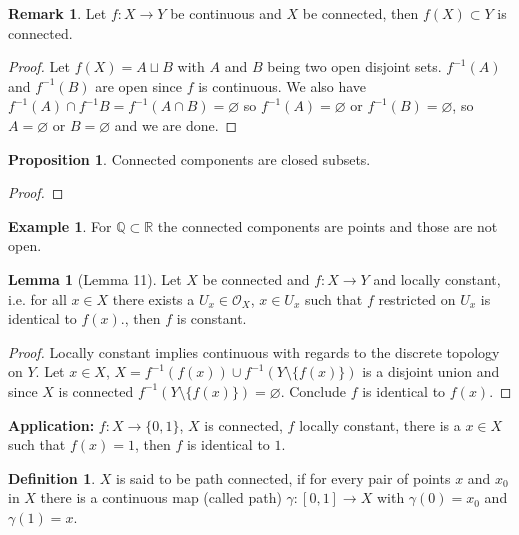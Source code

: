 \documentclass[a4paper]{book}
\theoremstyle{definition}
\newtheorem{definition}{Definition}[chapter]
\newtheorem{example}{Example}[definition]
\newtheorem{lemma}{Lemma}[definition]
\newtheorem{proposition}{Proposition}[definition]
\newtheorem*{remark}{Remark}
\begin{document}
    \begin{remark}
        Let \(f: X \longrightarrow Y\) be continuous and \(X\) be connected, then \(f(X) \subset Y\) is connected.
    \end{remark}
    \begin{proof}
        Let \(f(X) = A \sqcup B\) with \(A\) and \(B\) being two open disjoint sets. \(f^{-1}(A)\) and \(f^{-1}(B)\) are open since \(f\) is continuous. We also have \(f^{-1}(A) \cap f^{-1}B = f^{-1}(A \cap B) = \varnothing\) so \(f^{-1}(A) = \varnothing\) or \(f^{-1}(B) = \varnothing\), so \(A = \varnothing\) or \(B = \varnothing\) and we are done.
    \end{proof}
    \begin{proposition}
        Connected components are closed subsets.
    \end{proposition}
    \begin{proof}
    \end{proof}
    \begin{example}
        For \(\mathbb{Q} \subset \mathbb{R}\) the connected components are points and those are not open.
    \end{example}
    \begin{lemma}[Lemma 11]
        Let \(X\) be connected and \(f: X \longrightarrow Y\) and locally constant, i.e. for all \(x \in X\) there exists a \(U_x \in \mathcal{O}_X\), \(x \in U_x\) such that \(f\) restricted on \(U_x\) is identical to \(f(x)\)., then \(f\) is constant.
    \end{lemma}
    \begin{proof}
        Locally constant implies continuous with regards to the discrete topology on \(Y\). Let \(x \in X\), \(X = f^{-1}(f(x)) \cup f^{-1}(Y \setminus \{f(x)\})\) is a disjoint union and since \(X\) is connected \(f^{-1}(Y \setminus \{f(x)\}) = \varnothing\). Conclude \(f\) is identical to \(f(x)\).
    \end{proof}

    \textbf{Application:} \(f: X \longrightarrow \{0, 1\}\), \(X\) is connected, \(f\) locally constant, there is a \(x \in X\) such that \(f(x) = 1\), then \(f\) is identical to \(1\).

    \begin{defbox}
        \begin{definition}
            \(X\) is said to be {\color{maththen}path connected}, if for every pair of points \(x\) and \(x_0\) in \(X\) there is a continuous map (called path) \(\gamma: [0, 1] \longrightarrow X\) with \(\gamma(0) = x_0\) and \(\gamma(1) = x\).
        \end{definition}
    \end{defbox}
\end{document}
